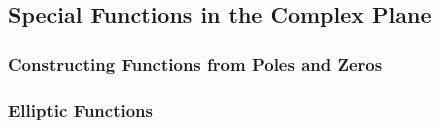 \subsection{Special Functions in the Complex Plane}

\subsubsection{Constructing Functions from Poles and Zeros}









\subsubsection{Elliptic Functions}

